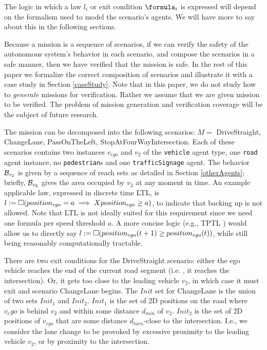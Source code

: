 
The logic in which a law $l_i$ or exit condition $\formula_i$ is expressed will depend on the formalism used to model the scenario's agents. 
We will have more to say about this in the following sections.

Because a mission is a sequence of scenarios, if we can verify the safety of the autonomous system's behavior in each scenario,
and compose the scenarios in a safe manner, 
then we have verified that the mission is safe.
In the rest of this paper we formalize the correct composition of scenarios and illustrate it with a case study in Section \ref{caseStudy}.
Note that in this paper, we do not study how to \emph{generate} missions for verification. 
Rather we assume that we are given mission to be verified. 
The problem of mission generation and verification coverage will be the subject of future research.

\begin{prob}
	
	\end{prob}


\begin{exmp}
	The mission can be decomposed into the following scenarios:
	$M = $ DriveStraight, ChangeLane, PassOnTheLeft, StopAtFourWayIntersection.
	Each of these scenarios contains two instances $v_{ego}$ and $v_2$ of the \texttt{vehicle} agent type, one \texttt{road} agent instance, no \texttt{pedestrian}s and one \texttt{trafficSignage} agent.
	The behavior $\mathcal{B}_{v_2}$ is given by a sequence of reach sets as detailed in Section \ref{otherAgents};
	briefly, $\mathcal{B}_{v_2}$ gives the area occupied by $v_2$ at any moment in time.
	An example applicable law, expressed in discrete time LTL, is $l := \square(position_{ego} = a \implies X position_{ego} \geq a)$, to indicate that backing up is not allowed.
	Note that LTL is not ideally suited for this requirement since we need one formula per speed threshold $a$. A more concise logic (e.g., TPTL \cite{alur94_really}) would allow us to directly say $l := \square(position_{ego}(t+1) \geq position_{ego}(t))$, while still being reasonably computationally tractable.
		
	There are two exit conditions for the DriveStraight scenario: either the ego vehicle reaches the end of the current road segment (i.e. , it reaches the intersection). 
	Or, it gets too close to the leading vehicle $v_2$, in which case it must exit and scenario ChangeLane begins.
	The $Init$ set for ChangeLane is the union of two sets $Init_1$ and $Init_2$.
	$Init_1$ is the set of 2D positions on the road where $v_ego$ is behind $v_2$ and within some distance $d_{min}$ of $v_2$.
	$Init_2$ is the set of 2D positions of $v_{ego}$ that are some distance $d_{turn}$-close to the intersection.
	I.e., we consider the lane change to be provoked by excessive proximity to the leading vehicle $v_2$, or by proximity to the intersection.	
\end{exmp}

